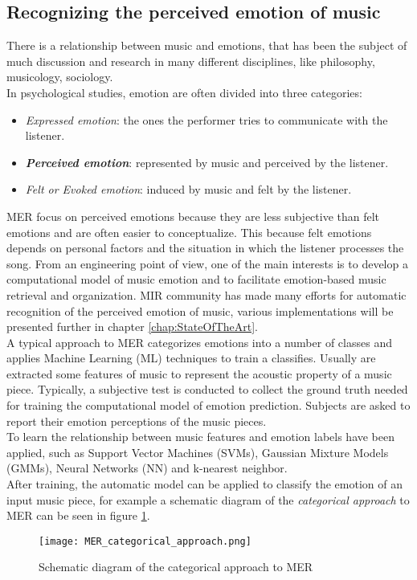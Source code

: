 \subsection{Recognizing the perceived emotion of music}
There is a relationship between music and emotions, that has been the subject of much discussion and research in many different disciplines, like philosophy, musicology, sociology.
\\
In psychological studies, emotion are often divided into three categories:
\begin{itemize}
	\item \textit{Expressed emotion}: the ones the performer tries to communicate with the listener.
	\item \textit{\textbf{Perceived emotion}}: represented by music and perceived by the listener.
	\item \textit{Felt or Evoked emotion}: induced by music and felt by the listener.
\end{itemize}

MER focus on perceived emotions because they are less subjective than felt emotions and are often easier to conceptualize. This because felt emotions depends on personal factors and the situation in which the listener processes the song.
From an engineering point of view, one of the main interests is to develop a computational model of music emotion and to facilitate emotion-based music retrieval and organization. MIR community has made many efforts for automatic recognition of the perceived emotion of music, various implementations will be presented further in chapter \ref{chap:StateOfTheArt}.
\\
A typical approach to MER categorizes emotions into a number of classes and applies Machine Learning (ML) techniques to train a classifies. Usually are extracted some features of music to represent the acoustic property of a music piece. Typically, a subjective test is conducted to collect the ground truth needed for training the computational model of emotion prediction. Subjects are asked to report their emotion perceptions of the music pieces.
\\
To learn the relationship between music features and emotion labels have been applied, such as Support Vector Machines (SVMs), Gaussian Mixture Models (GMMs), Neural Networks (NN) and k-nearest neighbor.
\\
After training, the automatic model can be applied to classify the emotion of an input music piece, for example a schematic diagram of the \textit{categorical approach} to MER can be seen in figure \ref{fig:MER_categorical_approach}.
\begin{figure}[h]
    \centering
    \texttt{[image: MER\_categorical\_approach.png]} 
	\caption{Schematic diagram of the categorical approach to MER}
    \label{fig:MER_categorical_approach}
\end{figure}

